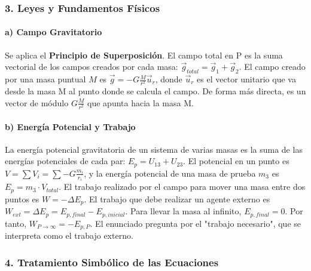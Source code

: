 \subsubsection*{3. Leyes y Fundamentos Físicos}
\paragraph{a) Campo Gravitatorio}
Se aplica el \textbf{Principio de Superposición}. El campo total en P es la suma vectorial de los campos creados por cada masa: $\vec{g}_{total} = \vec{g}_1 + \vec{g}_2$.
El campo creado por una masa puntual $M$ es $\vec{g} = -G\frac{M}{r^2}\vec{u}_r$, donde $\vec{u}_r$ es el vector unitario que va desde la masa M al punto donde se calcula el campo. De forma más directa, es un vector de módulo $G\frac{M}{r^2}$ que apunta hacia la masa M.

\paragraph{b) Energía Potencial y Trabajo}
La energía potencial gravitatoria de un sistema de varias masas es la suma de las energías potenciales de cada par: $E_p = U_{13} + U_{23}$. El potencial en un punto es $V = \sum V_i = \sum -G\frac{m_i}{r_i}$, y la energía potencial de una masa de prueba $m_3$ es $E_p = m_3 \cdot V_{total}$.
El trabajo realizado por el campo para mover una masa entre dos puntos es $W = -\Delta E_p$. El trabajo que debe realizar un agente externo es $W_{ext} = \Delta E_p = E_{p,final} - E_{p,inicial}$. Para llevar la masa al infinito, $E_{p,final}=0$. Por tanto, $W_{P \to \infty} = -E_{p,P}$. El enunciado pregunta por el "trabajo necesario", que se interpreta como el trabajo externo.

\subsubsection*{4. Tratamiento Simbólico de las Ecuaciones}

